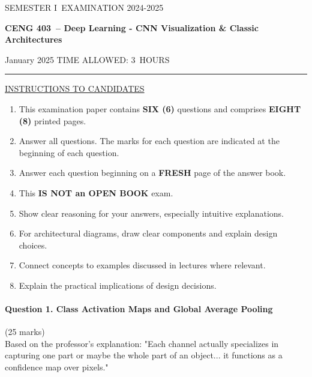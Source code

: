 \documentclass[12pt]{article}
\newcommand{\masunitnumber}{CENG 403}
\newcommand{\examdate}{January 2025}
\newcommand{\academicyear}{2024-2025}
\newcommand{\semester}{I}
\newcommand{\coursename}{Deep Learning - CNN Visualization \& Classic Architectures}
\newcommand{\numberofhours}{3}
\begin{document}
\setlength{\headsep}{5truemm}
\setlength{\headheight}{14.5truemm}
\setlength{\voffset}{-0.45truein}
\renewcommand{\headrulewidth}{0.0pt}
\begin{center}
SEMESTER \semester\ EXAMINATION \academicyear
\end{center}
\begin{center}
{\bf \masunitnumber\ -- \coursename}
\end{center}
\vspace{20truemm}
\noindent \examdate\hspace{45truemm} TIME ALLOWED: \numberofhours\ HOURS
\vspace{19truemm}
\hrule
\vspace{19truemm}
\noindent\underline{INSTRUCTIONS TO CANDIDATES}
\vspace{8truemm}
\begin{enumerate}
\item This examination paper contains {\bf SIX (6)} questions and comprises 
{\bf EIGHT (8)} printed pages.
\item Answer all questions. 
The marks for each question are indicated at the beginning of each question.
\item Answer each question beginning on a {\bf FRESH} page of the answer book.
\item This {\bf IS NOT an OPEN BOOK} exam.
\item Show clear reasoning for your answers, especially intuitive explanations.
\item For architectural diagrams, draw clear components and explain design choices.
\item Connect concepts to examples discussed in lectures where relevant.
\item Explain the practical implications of design decisions.
\end{enumerate}
\newpage
\lhead{}
\rhead{\masunitnumber}
\chead{}
\lfoot{}
\cfoot{\thepage}
\rfoot{}
\setlength{\footskip}{45pt}

\paragraph{Question 1. Class Activation Maps and Global Average Pooling}{\hfill (25 marks)}\\
Based on the professor's explanation: "Each channel actually specializes in capturing one part or maybe the whole part of an object... it functions as a confidence map over pixels."
\end{document}
